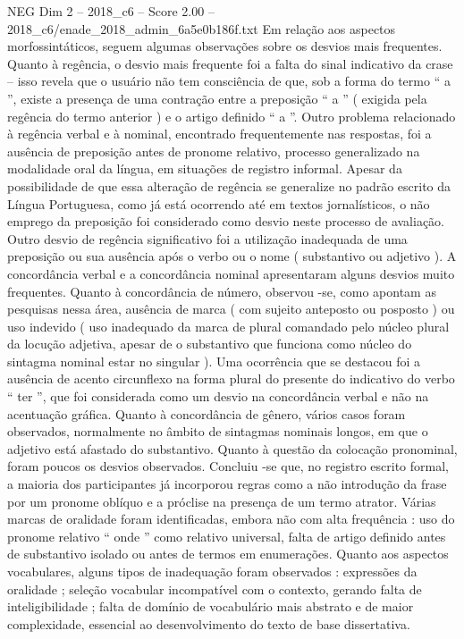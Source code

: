 \begin{textsample}{NEG Dim 2 – 2018\_c6 – Score 2.00 – 2018\_c6/enade\_2018\_admin\_6a5e0b186f.txt}
Em relação aos aspectos morfossintáticos, seguem algumas observações sobre os desvios mais frequentes.
Quanto à regência, o desvio mais frequente foi a falta do sinal indicativo da crase – isso revela que o usuário não tem consciência de que, sob a forma do termo “ a ”, existe a presença de uma contração entre a preposição “ a ” ( exigida pela regência do termo anterior ) e o artigo definido “ a ”.
Outro problema relacionado à regência verbal e à nominal, encontrado frequentemente nas respostas, foi a ausência de preposição antes de pronome relativo, processo generalizado na modalidade oral da língua, em situações de registro informal.
Apesar da possibilidade de que essa alteração de regência se generalize no padrão escrito da Língua Portuguesa, como já está ocorrendo até em textos jornalísticos, o não emprego da preposição foi considerado como desvio neste processo de avaliação.
Outro desvio de regência significativo foi a utilização inadequada de uma preposição ou sua ausência após o verbo ou o nome ( substantivo ou adjetivo ).
A concordância verbal e a concordância nominal apresentaram alguns desvios muito frequentes.
Quanto à concordância de número, observou -se, como apontam as pesquisas nessa área, ausência de marca ( com sujeito anteposto ou posposto ) ou uso indevido ( uso inadequado da marca de plural comandado pelo núcleo plural da locução adjetiva, apesar de o substantivo que funciona como núcleo do sintagma nominal estar no singular ).
Uma ocorrência que se destacou foi a ausência de acento circunflexo na forma plural do presente do indicativo do verbo “ ter ”, que foi considerada como um desvio na concordância verbal e não na acentuação gráfica.
Quanto à concordância de gênero, vários casos foram observados, normalmente no âmbito de sintagmas nominais longos, em que o adjetivo está afastado do substantivo.
Quanto à questão da colocação pronominal, foram poucos os desvios observados.
Concluiu -se que, no registro escrito formal, a maioria dos participantes já incorporou regras como a não introdução da frase por um pronome oblíquo e a próclise na presença de um termo atrator.
Várias marcas de oralidade foram identificadas, embora não com alta frequência : uso do pronome relativo “ onde ” como relativo universal, falta de artigo definido antes de substantivo isolado ou antes de termos em enumerações.
Quanto aos aspectos vocabulares, alguns tipos de inadequação foram observados : expressões da oralidade ; seleção vocabular incompatível com o contexto, gerando falta de inteligibilidade ; falta de domínio de vocabulário mais abstrato e de maior complexidade, essencial ao desenvolvimento do texto de base dissertativa.

\end{textsample}
